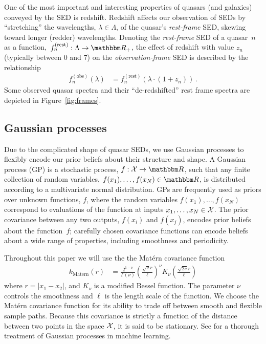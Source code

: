 \documentclass{article} %
\begin{document}
One of the most important and interesting properties of quasars (and galaxies) conveyed by the SED is redshift. 
Redshift affects our observation of SEDs by ``stretching'' the wavelengths, ${\lambda \in \Lambda}$, of the quasar's \emph{rest-frame} SED, skewing toward longer (redder) wavelengths.
Denoting the \emph{rest-frame} SED of a quasar~$n$ as a function,~${f_n^{(\text{rest})} : \Lambda \rightarrow \R_+}$, the effect of redshift with value $z_n$ (typically between 0 and 7) on the \emph{observation-frame} SED is described by the relationship 
\begin{align}
  f_n^{(\text{obs})}(\lambda) &= f_n^{(\text{rest})}(\lambda \cdot (1 + z_n)) \, .
\end{align}
Some observed quasar spectra and their ``de-redshifted'' rest frame spectra are depicted in Figure~\ref{fig:frames}.

\subsection{Gaussian processes}
Due to the complicated shape of quasar SEDs, we use Gaussian processes to flexibly encode our prior beliefs about their structure and shape. 
A Gaussian process (GP) is a stochastic process, ${f: \mathcal{X} \rightarrow \R}$, such that any finite collection of random variables, ${f(x_1),\dots, f(x_N) \in \R}$, is distributed according to a multivariate normal distribution.  
GPs are frequently used as priors over unknown functions, $f$, where the random variables $f(x_1), \dots, f(x_N)$ correspond to evaluations of the function at inputs ${x_1, \dots, x_N \in \mathcal{X}}$.  
The prior covariance between any two outputs, $f(x_i)$ and $f(x_j)$, encodes prior beliefs about the function~$f$; carefully chosen covariance functions can encode beliefs about a wide range of properties, including smoothness and periodicity.  

Throughout this paper we will use the the Mat\'{e}rn \cite{Matern1986spatial} covariance function
\begin{align}
  k_{\text{Matern}}(r)
    &= \frac{2^{1-\nu}}{\Gamma(\nu)} 
       \left( \frac{\sqrt{\nu} r}{\ell} \right) ^\nu
       K_\nu\left( \frac{\sqrt{2\nu} r}{\ell}\right)
\end{align}
where ${r = |x_1 - x_2|}$, and $K_\nu$ is a modified Bessel function.  The parameter $\nu$ controls the smoothness and $\ell$ is the length scale of the function.  
We choose the Mat\'{e}rn covariance function for its ability to trade off between smooth and flexible sample paths.  
Because this covariance is strictly a function of the distance between two points in the space $\mathcal{X}$, it is said to be stationary. 
See \cite{rasmussen2006gaussian} for a thorough treatment of Gaussian processes in machine learning. 
\end{document}
